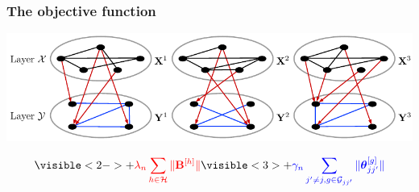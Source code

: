 \documentclass[10pt]{beamer}
\theoremstyle{definition}
\DeclareMathOperator*{\Tr}{Tr}
\DeclareMathOperator*{\argmin}{argmin}
\begin{document}
\begin{frame}
\frametitle{The objective function}

\begin{center}
\includegraphics[width=.9\textwidth]{multitwolayer}
\end{center}


$$
\visible<2->{ + {\colr \lambda_n \sum_{h \in \cH} \| \bfB^{[h]} \|}}
\visible<3>{ + {\colb \gamma_n \sum_{j' \neq j, g \in \cG_{jj'}} \| \bftheta_{jj'}^{[g]} \|}}
$$

\end{frame}
%
%
%
%
%
%
\end{document}
